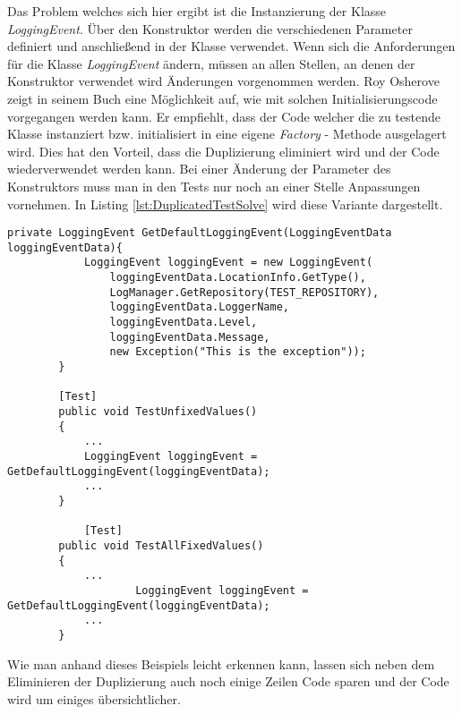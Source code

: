 \SuperPar Das Problem welches sich hier ergibt ist die Instanzierung der Klasse \textit{LoggingEvent}. Über den Konstruktor werden die verschiedenen Parameter definiert und anschließend in der Klasse verwendet. Wenn sich die Anforderungen für die Klasse \textit{LoggingEvent} ändern,  müssen an allen Stellen, an denen der Konstruktor verwendet wird Änderungen vorgenommen werden. Roy Osherove zeigt in seinem Buch \cite{Osherove2013} eine Möglichkeit auf, wie mit solchen Initialisierungscode vorgegangen werden kann. Er empfiehlt, dass der Code welcher die zu testende Klasse instanziert bzw. initialisiert in eine eigene \textit{Factory} - Methode ausgelagert wird. Dies hat den Vorteil, dass die Duplizierung eliminiert wird und der Code wiederverwendet werden kann. Bei einer Änderung der Parameter des Konstruktors muss man in den Tests nur noch an einer Stelle Anpassungen vornehmen. In Listing \ref{lst:DuplicatedTestSolve} wird diese Variante dargestellt.


\begin{lstlisting}[language={[Sharp]C}, caption=Eliminerung der Duplizierung durch Factorymethode, label=lst:DuplicatedTestSolve]
		private LoggingEvent GetDefaultLoggingEvent(LoggingEventData loggingEventData){
			LoggingEvent loggingEvent = new LoggingEvent(
				loggingEventData.LocationInfo.GetType(),
				LogManager.GetRepository(TEST_REPOSITORY),
				loggingEventData.LoggerName,
				loggingEventData.Level,
				loggingEventData.Message,
				new Exception("This is the exception"));
		}

		[Test]
		public void TestUnfixedValues()
		{
			...
			LoggingEvent loggingEvent = GetDefaultLoggingEvent(loggingEventData);
			...
		}
		
			[Test]
		public void TestAllFixedValues()
		{
			...
					LoggingEvent loggingEvent = GetDefaultLoggingEvent(loggingEventData);
			...
		}
\end{lstlisting}

\SuperPar Wie man anhand dieses Beispiels leicht erkennen kann, lassen sich neben dem Eliminieren der Duplizierung auch noch einige Zeilen Code sparen und der Code wird um einiges übersichtlicher.